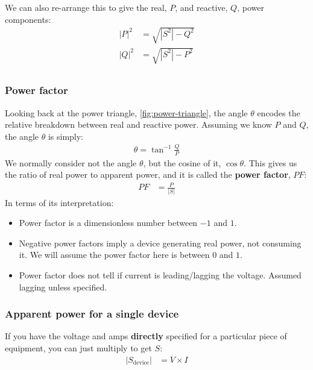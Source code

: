 \documentclass{pgnotes}
\begin{document}
We can also re-arrange this to give the real, $P$, and reactive, $Q$, power components: 
\begin{align}
  \left \lvert P \right \rvert ^2 & = \sqrt{ \left \lvert S^2 \right \rvert - Q^2 } \\
  \left \lvert Q \right \rvert ^2 & = \sqrt{ \left \lvert S^2 \right \rvert - P^2 } \\
\end{align}

\subsubsection{Power factor}
\label{sec:power-factor}

Looking back at the power triangle, \autoref{fig:power-triangle}, the angle $\theta$ encodes the relative breakdown between real and reactive power.
Assuming we know $P$ and $Q$, the angle $\theta$ is simply:
\begin{align}
  \theta = \tan^{-1} \frac{Q}{P} 
\end{align}
We normally consider not the angle $\theta$, but the cosine of it, $\cos \theta$.
This gives us the ratio of real power to apparent power, and it is called the \textbf{power factor}, $PF$: 
\begin{align}
  PF & = \frac{P}{\left \lvert S \right \rvert}
\end{align}
In terms of its interpretation:
\begin{itemize}
\item Power factor is a dimensionless number between $-1$ and $1$.
\item Negative power factors imply a device generating real power, not consuming it. We will assume the power factor here is between $0$ and $1$.
\item Power factor does not tell if current is leading/lagging the voltage. Assumed lagging unless specified.
\end{itemize}

\subsubsection{Apparent power for a single device}

If you have the voltage and amps \textbf{directly} specified for a particular piece of equipment, you can just multiply to get $S$:
\begin{align}
  \left \vert S_{\mbox{device}} \right \rvert & = V \times I 
\end{align}
\end{document}
